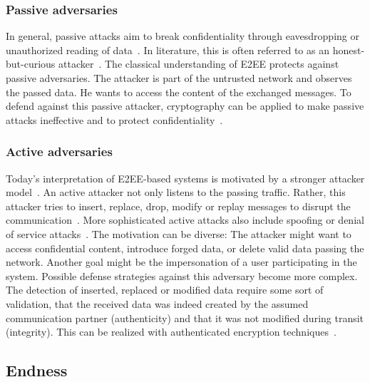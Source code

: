 \documentclass[../main.tex]{subfiles}
\begin{document}
\subsubsection{Passive adversaries}
In general, passive attacks aim to break confidentiality through eavesdropping or unauthorized reading of data~\cite{Eckert2018}. 
In literature, this is often referred to as an honest-but-curious attacker~\cite{Nabeel2017}.
The classical understanding of E2EE protects against passive adversaries. 
The attacker is part of the untrusted network and observes the passed data.
He wants to access the content of the exchanged messages.
To defend against this passive attacker, cryptography can be applied to make passive attacks ineffective and to protect confidentiality~\cite{Eckert2018}.


\subsubsection{Active adversaries}
Today's interpretation of E2EE-based systems is motivated by a stronger attacker model~\cite{Hale2022}.
An active attacker not only listens to the passing traffic.
Rather, this attacker tries to insert, replace, drop, modify or replay messages to disrupt the communication~\cite{Nabeel2017}.
More sophisticated active attacks also include spoofing or denial of service attacks~\cite{Eckert2018}.
The motivation can be diverse: 
The attacker might want to access confidential content, introduce forged data, or delete valid data passing the network.
Another goal might be the impersonation of a user participating in the system.
Possible defense strategies against this adversary become more complex.
The detection of inserted, replaced or modified data require some sort of validation, that the received data was indeed created by the assumed communication partner (authenticity) and that it was not modified during transit (integrity).
This can be realized with authenticated encryption techniques~\cite{Mallory2022}.

\subsection{Endness}
\end{document}
